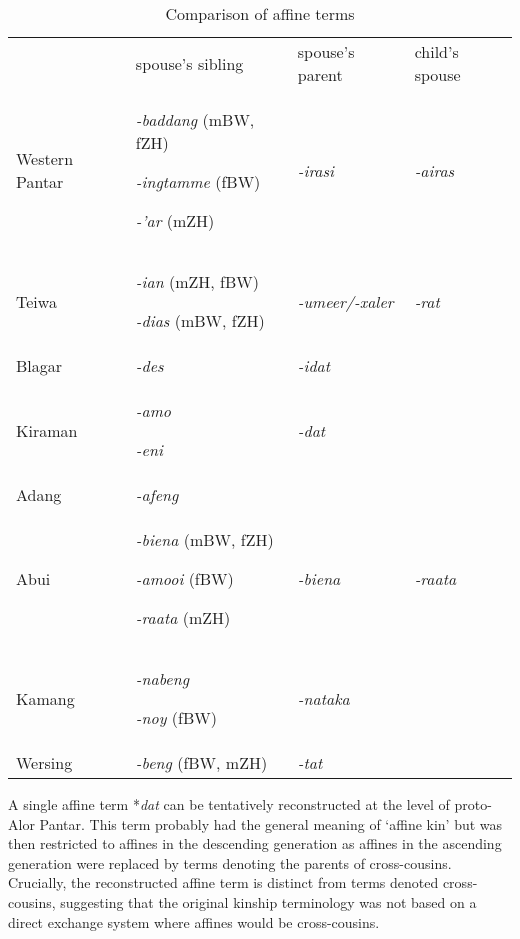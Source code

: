 \begin{table}
\begin{tabular}{llll} & spouse's sibling \par & spouse's parent\par & child's spouse\par\\
Western Pantar & \textit{{}-baddang} (mBW, fZH)

\textit{{}-ingtamme} (fBW)

\textit{{}-'ar} (mZH) & \textit{{}-irasi}\par & \textit{{}-airas}\par\\
Teiwa & \textit{{}-ian} (mZH, fBW)

\textit{{}-dias} (mBW, fZH) & \textit{{}-umeer/-xaler}\par & \textit{{}-rat}\par\\
Blagar & \textit{{}-des} & \multicolumn{2}{l}{ \textit{{}-idat}\par

}\\
Kiraman & \textit{{}-amo}

\textit{{}-eni} & \multicolumn{2}{l}{ \textit{{}-dat}\par

}\\
Adang & \textit{{}-afeng} &  & \\
Abui & \textit{{}-biena} (mBW, fZH)

\textit{{}-amooi} (fBW)

\textit{{}-raata} (mZH) & \textit{{}-biena}\par & \textit{{}-raata}\par\\
Kamang & \textit{{}-nabeng}

\textit{{}-noy} (fBW) & \multicolumn{2}{l}{ \textit{{}-nataka}\par

}\\
Wersing & \textit{{}-beng} (fBW, mZH) & \multicolumn{2}{l}{ \textit{{}-tat}\par

}\\
\end{tabular}

\caption{Comparison of affine terms}
\end{table}

A single affine term *\textit{dat} can be tentatively reconstructed at the level of proto-Alor Pantar. This term probably had the general meaning of `affine kin' but was then restricted to affines in the descending generation as affines in the ascending generation were replaced by terms denoting the parents of cross-cousins. Crucially, the reconstructed affine term is distinct from terms denoted cross-cousins, suggesting that the original kinship terminology was not based on a direct exchange system where affines would be cross-cousins.

